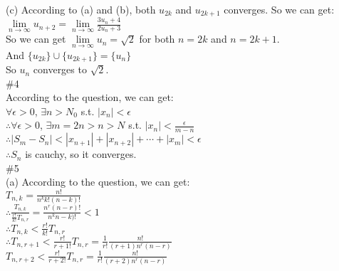 \documentclass{article}
\begin{document}
(c) According to (a) and (b), both $u_{2k}$ and $u_{2k+1}$ converges. So we can get:\\

$\displaystyle \lim \limits_{n \to \infty}u_{n+2}=\lim \limits_{n \to \infty}\frac{3u_n+4}{2u_n+3}$\\

So we can get $\lim \limits_{n \to \infty}u_n=\sqrt{2}$ for both $n=2k$ and $n=2k+1$.\\

And $\{u_{2k}\}\cup\{u_{2k+1}\}=\{u_n\}$\\

So $u_n$ converges to $\sqrt{2}$.\\

\textcolor[rgb]{0.00,0.00,0.50}{\#4}\\

According to the question, we can get:\\

$\forall \epsilon>0$, $\exists n>N_0$ s.t. $|x_n|<\epsilon$\\

$\therefore$\qquad$\forall \epsilon>0$, $\exists m=2n>n>N$ s.t. $|x_n|<\frac{\epsilon}{m-n}$\\

$\therefore$\qquad$\left|S_m-S_n\right|<\left|x_{n+1}\right|+\left|x_{n+2}\right|+\cdots+\left|x_m\right|<\epsilon$\\

$\therefore$\qquad$S_n$ is cauchy, so it converges.\\

\textcolor[rgb]{0.00,0.00,0.50}{\#5}\\

(a) According to the question, we can get:\\

$\displaystyle T_{n,k}=\frac{n!}{n^kk!(n-k)!}$\\

$\therefore$\qquad$\displaystyle \frac{T_{n,k}}{\frac{r!}{k!}T_{n,r}}=\frac{n^r(n-r)!}{n^kn-k)!}<1$\\

$\therefore$\qquad$\displaystyle T_{n,k}<\frac{r!}{k!}T_{n,r}$\\

$\therefore$\qquad$\displaystyle T_{n,r+1}<\frac{r!}{r+1!}T_{n,r}=\frac{1}{r!}\frac{n!}{(r+1)n^r(n-r)}$\\

\qquad\quad$\displaystyle T_{n,r+2}<\frac{r!}{r+2!}T_{n,r}=\frac{1}{r!}\frac{n!}{(r+2)n^r(n-r)}$\\
\end{document}
